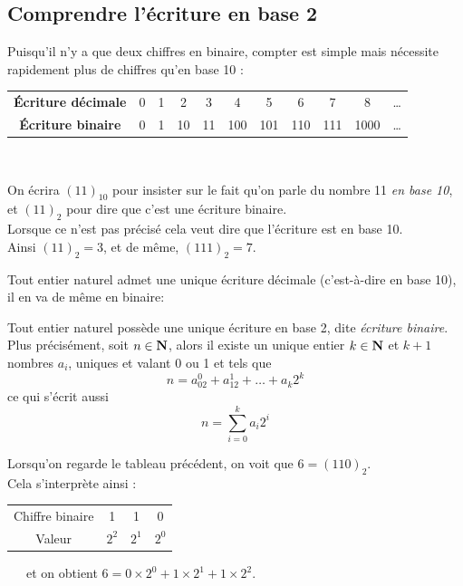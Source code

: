 \subsection{Comprendre l'écriture en base 2}

Puisqu'il n'y a que deux chiffres en binaire, compter est simple mais nécessite rapidement plus de chiffres qu'en base
10 :\\

\begin{center}
    \alternaterowcolors
    \begin{tabular}{CCCCCCCCCCC}

        \textbf{\'Ecriture décimale} & 0 & 1 & 2  & 3  & 4   & 5   & 6   & 7   & 8    & \dots \\

        \textbf{\'Ecriture binaire}  & 0 & 1 & 10 & 11 & 100 & 101 & 110 & 111 & 1000 & \dots \\
    \end{tabular} \\[1em]
\end{center}

\begin{notation}
    On écrira $(11)_{10}$ pour insister sur le fait qu'on parle du nombre 11 \textit{en base 10}, et $(11)_2$ pour dire que c'est une écriture
    binaire.\\
    Lorsque ce n'est pas précisé cela veut dire que l'écriture est en base 10.\\
    Ainsi $(11)_2=3$, et de même, $(111)_2=7$.\\
\end{notation}


Tout entier naturel admet une unique écriture décimale (c'est-à-dire en base 10), il en va de même en binaire:
\begin{propriete}
    Tout entier naturel possède une unique écriture en base 2, dite \textit{écriture binaire}.
    Plus précisément, soit $n\in\mathbf{N}$, alors il existe un unique entier $k\in\mathbf{N}$ et $k+1$ nombres $a_i$, uniques et valant 0
    ou 1 et tels que $$n=a_02^0+a_12^1+\ldots+a_k2^k$$
    ce qui s'écrit aussi
    $$n=\sum_{i=0}^ka_i2^i$$
\end{propriete}
\begin{exemple}
    Lorsqu'on regarde le tableau précédent, on voit que $6=(110)_2$.\\Cela s'interprète ainsi :\\

    \alternaterowcolors
    \begin{tabular}{CCCC}
        Chiffre binaire & 1     & 1     & 0     \\
        Valeur          & $2^2$ & $2^1$ & $2^0$ \\
    \end{tabular}\ \ \ et on obtient $6=0\times 2^0+1\times 2^1+1\times 2^2$.
\end{exemple}

